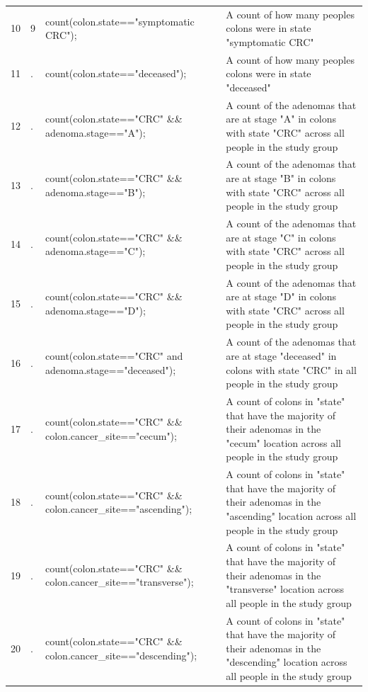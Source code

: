 \documentclass[11pt]{article}
\begin{document}
\begin{landscape}
\begin{longtable}{||l|l|p{11.3cm}|p{11.3cm}||}
10           & 9       & count(colon.state=="symptomatic CRC");                                        & A count of how many peoples colons were in state "symptomatic CRC" \\
11           & .       & count(colon.state=="deceased");                                               & A count of how many peoples colons were in state "deceased" \\
12           & .       & count(colon.state=="CRC" \&\& adenoma.stage=="A");                            &   A count of the adenomas that are at stage "A" in colons with state "CRC" across all people in the study group \\
13           & .       & count(colon.state=="CRC" \&\& adenoma.stage=="B");                            &   A count of the adenomas that are at stage "B" in colons with state "CRC" across all people in the study group \\
14           & .       & count(colon.state=="CRC" \&\& adenoma.stage=="C");                            &   A count of the adenomas that are at stage "C" in colons with state "CRC" across all people in the study group \\
15           & .       & count(colon.state=="CRC" \&\& adenoma.stage=="D");                            &   A count of the adenomas that are at stage "D" in colons with state "CRC" across all people in the study group \\
16           & .       & count(colon.state=="CRC" and adenoma.stage=="deceased");                      &   A count of the adenomas that are at stage "deceased" in colons with state "CRC" in all people in the study group \\
17           & .       & count(colon.state=="CRC" \&\& colon.cancer\_site=="cecum");                    &   A count of colons in "state" that have the majority of their adenomas in the "cecum" location across all people in the study group \\
18           & .       & count(colon.state=="CRC" \&\& colon.cancer\_site=="ascending");                &   A count of colons in "state" that have the majority of their adenomas in the "ascending" location across all people in the study group \\
19           & .       & count(colon.state=="CRC" \&\& colon.cancer\_site=="transverse");               &   A count of colons in "state" that have the majority of their adenomas in the "transverse" location across all people in the study group \\
20           & .       & count(colon.state=="CRC" \&\& colon.cancer\_site=="descending");               &   A count of colons in "state" that have the majority of their adenomas in the "descending" location across all people in the study group \\

\end{longtable}
\end{landscape}
\end{document}
